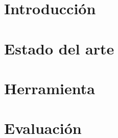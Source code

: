 \documentclass[a4paper]{report}
\begin{document}








% 

\chapter{Introducci\'on}


\chapter{Estado del arte}


\chapter{Herramienta}


\chapter{Evaluaci\'on}





\end{document}
